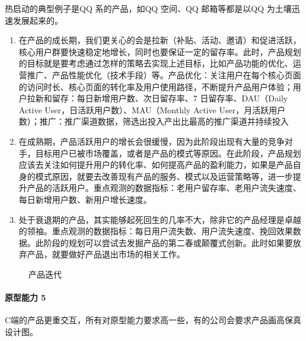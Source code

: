 \documentclass[letterpaper,11pt,english]{sphinxmanual}
\begin{document}
热启动的典型例子是QQ 系的产品，如QQ 空间、QQ 邮箱等都是以QQ
为土壤迅速发展起来的。%
\begin{footnote}[37]\sphinxAtStartFootnote
{}
%
\end{footnote}
\begin{enumerate}
%
\setcounter{enumi}{1}
\item {} 
在产品的成长期，我们更关心的会是拉新（补贴、活动、邀请）和促进活跃，核心用户群要快速稳定地增长，同时也要保证一定的留存率。此时，产品规划的目标就是要考虑通过怎样的策略去实现上述目标，比如产品功能的优化、运营推广、产品性能优化（技术手段）等。产品优化：关注用户在每个核心页面的访问时长、核心页面的转化率及用户使用路径，不断提升产品用户体验；用户拉新和留存：每日新增用户数、次日留存率、7
日留存率、DAU（Daily Active User，日活跃用户数）、MAU（Monthly Active
User，月活跃用户数）；推广：推广渠道数据，筛选出投入产出比最高的推广渠道并持续投入

\item {} 
在成熟期，产品活跃用户的增长会很缓慢，因为此阶段出现有大量的竞争对手，目标用户已被市场覆盖，或者是产品的模式等原因。在此阶段，产品规划应该去关注如何提升用户的转化率、如何提高产品的盈利能力，如果是产品自身的模式原因，就要去改善现有产品的服务、模式以及运营策略等，进一步提升产品的活跃用户。重点观测的数据指标：老用户留存率、老用户流失速度、每日新增用户数、新用户增长速度。

\item {} 
处于衰退期的产品，其实能够起死回生的几率不大，除非它的产品经理是卓越的领袖。重点观测的数据指标：每日用户流失数、用户流失速度、挽回效果数据。此阶段的规划可以尝试去发掘产品的第二春或颠覆式创新。此时如果要放弃产品，就要做好产品退出市场的相关工作。

\end{enumerate}

\begin{figure}[H]
\centering
\capstart

\noindent{}
\caption{产品迭代}\label{\detokenize{chapter_introduction/2C:id12}}\end{figure}


\paragraph{原型能力 5\sphinxfootnotemark[38]}
\label{\detokenize{chapter_introduction/2C:id10}}%
\begin{footnotetext}[38]\sphinxAtStartFootnote
{}
%
\end{footnotetext}\ignorespaces 
C端的产品更重交互，所有对原型能力要求高一些，有的公司会要求产品画高保真设计图。
\end{document}
